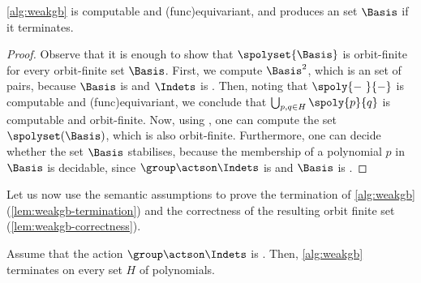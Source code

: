 \begin{algorithm}
  \caption{Computing  using the algorithm .}
    \label{alg:weakgb}
\end{algorithm}
%
\begin{lemma}
  \label{lem:weakgb-computable}
  \cref{alg:weakgb} is computable and \kl(func){equivariant},
  and produces an  set $\Basis$ if it terminates.
\end{lemma}
%
\begin{proof}
  Observe that it is enough to show that $\spolyset{\Basis}$ is orbit-finite for every orbit-finite set $\Basis$.
  First, we compute $\Basis^2$, which is an  set of pairs,
  because $\Basis$ is  and $\Indets$ is 
  .
  Then, noting that $\spoly{-\ }{-}$ is computable and \kl(func){equivariant},
  we conclude
  that $\bigcup_{p,q \in H}{\spoly{p}{q}}$
  is computable and orbit-finite.
  Now, using , one can compute the set $\spolyset(\Basis)$, which is also orbit-finite.
  Furthermore, one can decide whether the set $\Basis$ stabilises,
  because the membership of a polynomial $p$ in $\Basis$ is decidable,
  since $\group\actson\Indets$ is  and $\Basis$ is .
\end{proof}


Let us now use the semantic assumptions to prove the termination of
\cref{alg:weakgb}
(\cref{lem:weakgb-termination})
and the correctness of the resulting orbit finite set
(\cref{lem:weakgb-correctness}).

\begin{lemma}[name={},restate={lem:weakgb-termination}]
  \label{lem:weakgb-termination}
  Assume that the action $\group \actson \Indets$ is .
  Then, 
  \cref{alg:weakgb} terminates
  on every  set $H$ of polynomials.
\end{lemma}


